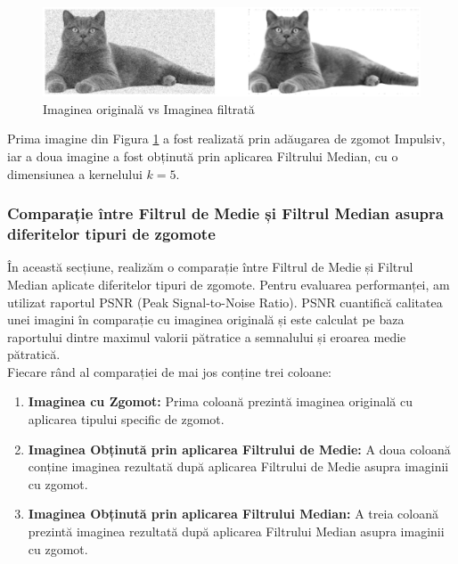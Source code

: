 \documentclass[12pt]{article}
\begin{document}
\begin{figure}[h!]
    \centering
    \includegraphics[width=1\textwidth]{images/filtru_median.eps}
    \caption{Imaginea originală vs Imaginea filtrată}
    \label{fig:img3}
\end{figure}

Prima imagine din Figura \ref{fig:img3} a fost realizată prin adăugarea de zgomot Impulsiv, iar a doua imagine a fost obținută prin aplicarea Filtrului Median, cu o dimensiunea a kernelului ${k=5}$. \\[15pt]


\subsubsection{Comparație între Filtrul de Medie și Filtrul Median asupra diferitelor tipuri de zgomote}
\indent În această secțiune, realizăm o comparație între Filtrul de Medie și Filtrul Median aplicate diferitelor tipuri de zgomote. Pentru evaluarea performanței, am utilizat raportul PSNR (Peak Signal-to-Noise Ratio). PSNR cuantifică calitatea unei imagini în comparație cu imaginea originală și este calculat pe baza raportului dintre maximul valorii pătratice a semnalului și eroarea medie pătratică. \\
\indent Fiecare rând al comparației de mai jos conține trei coloane:

\begin{enumerate}
    \item \textbf{Imaginea cu Zgomot:} Prima coloană prezintă imaginea originală cu aplicarea tipului specific de zgomot.

    \item \textbf{Imaginea Obținută prin aplicarea Filtrului de Medie:} A doua coloană conține imaginea rezultată după aplicarea Filtrului de Medie asupra imaginii cu zgomot.

    \item \textbf{Imaginea Obținută prin aplicarea Filtrului Median:} A treia coloană prezintă imaginea rezultată după aplicarea Filtrului Median asupra imaginii cu zgomot.
\end{enumerate}
\end{document}
